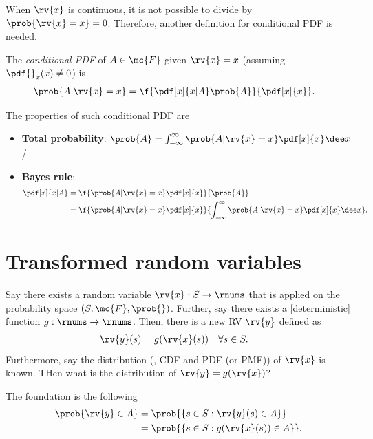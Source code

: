 When $\rv{x}$ is continuous, it is not possible to divide by $\prob{\rv{x}=x}=0$. Therefore, another definition for conditional PDF is needed.
\begin{mydefinition}
  The \emph{conditional PDF} of $A\in\mc{F}$ given $\rv{x}=x$ (assuming $\pdf{}_{x}(x)\neq0$) is
  \begin{align}
      \prob{A| \rv{x}=x} &= \f{\pdf[x]{x|A}\prob{A}}{\pdf[x]{x}}.
  \end{align}
\end{mydefinition}
The properties of such conditional PDF are
\begin{itemize}
    \item \textbf{Total probability}: $\prob{A}=\int_{-\infty}^{\infty} \prob{A|\rv{x}=x}\pdf[x]{x}\dee x$/
    \item \textbf{Bayes rule}:
    \begin{align}
        \pdf[x]{x|A} 
        &= \f{\prob{A|\rv{x}=x}\pdf[x]{x}}{\prob{A}}\\
        &= \f{\prob{A|\rv{x}=x}\pdf[x]{x}}{\int_{-\infty}^{\infty}\prob{A|\rv{x}=x}\pdf[x]{x}\dee x}.
    \end{align}
\end{itemize}



\section{Transformed random variables}
\label{sec: SRV: Transformed random variables}
Say there exists a random variable $\rv{x}: S\to\rnums$ that is applied on the probability space $(S,\mc{F},\prob{})$. Further, say there exists a [deterministic] function $g:\rnums\to\rnums$. Then, there is a new RV $\rv{y}$ defined as 
\begin{align}
    \rv{y}(s) &= g(\rv{x}(s)) \quad\forall s\in S.
\end{align}
Furthermore, say the distribution (\ie, CDF and PDF (or PMF)) of $\rv{x}$ is known. THen what is the distribution of $\rv{y}=g(\rv{x})$?

The foundation is the following
\begin{align}
    \prob{\rv{y}\in{A}}
    &= \prob{\left\{ s\in S : \rv{y}(s)\in A\right\}}\\
    &= \prob{\left\{ s\in S : g(\rv{x}(s))\in A\right\}}.
\end{align}

